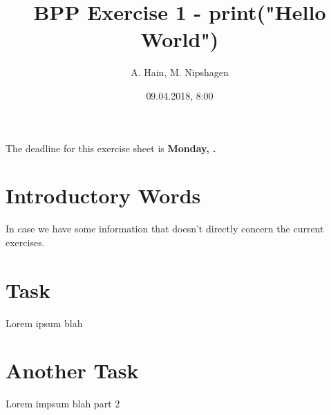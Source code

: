 \documentclass{article}
\title{BPP Exercise 1 - print("Hello World")}
\author{A. Hain, M. Nipshagen}
\date{09.04.2018, 8:00}
\makeatletter
\let\thedate\@date
\makeatother
\begin{document}
The deadline for this exercise sheet is \textbf{Monday, \thedate.}

\section*{Introductory Words}
In case we have some information that doesn't directly concern the current exercises.

\section{Task}
Lorem ipsum blah

\section{Another Task}
Lorem impsum blah part 2
\end{document}
